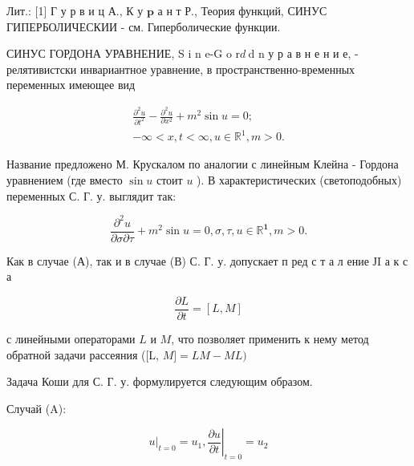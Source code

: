 \documentclass[10pt]{article}
\begin{document}
Лит.: [1] Г у р в и ц А., К у $\mathbf{p}$ а н т Р., Теория функций, СИНУС ГИПЕРБОЛИЧЕСКИИ - см. Гиперболические функции.



СИНУС ГОРДОНА УРАВНЕНИЕ, S i n e-G o $\mathrm{r} d \mathrm{~d}$ n у р а в н е н и е, - релятивистски инвариантное уравнение, в пространственно-временных переменных имеющее вид



\[

\begin{gathered}

\frac{\partial^{2} u}{\partial t^{2}}-\frac{\partial^{2} u}{\partial x^{2}}+m^{2} \sin u=0 ; \\

-\infty<x, t<\infty, u \in \mathbb{R}^{1}, m>0 .

\end{gathered}

\]



Название предложено М. Крускалом по аналогии с линейным Клейна - Гордона уравнением (где вместо $\sin u$ стоит $u$ ). В характеристических (светоподобных) переменных С. Г. у. выглядит так:



\[

\frac{\partial^{2} u}{\partial \sigma \partial \tau}+m^{2} \sin u=0, \sigma, \tau, u \in \mathbb{R}^{\mathbf{1}}, m>0 .

\]



Как в случае (А), так и в случае (В) С. Г. у. допускает п ред с т а л ение ЈI а к с а



\[

\frac{\partial L}{\partial t}=[L, M]

\]



с линейными операторами $L$ и $M$, что позволяет применить к нему метод обратной задачи рассеяния ([L, $M]=L M-M L)$



Задача Коши для С. Г. у. формулируется следующим образом.



Случай (A):



\[

\left.u\right|_{t=0}=u_{1},\left.\frac{\partial u}{\partial t}\right|_{t=0}=u_{2}

\]
\end{document}
